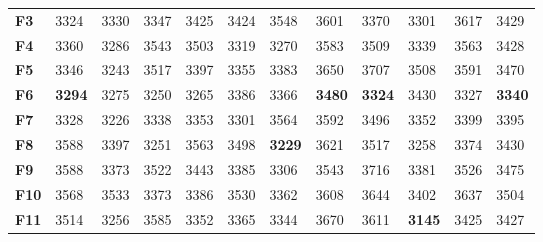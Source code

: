\documentclass[runningheads]{llncs}
\begin{document}
\begin{table}
\begin{center}
\begin{tabular}{|l|l|l|l|l|l|l|l|l|l|l|l|}
      \textbf{F3}          & 3324                           & 3330                           & 3347                           & 3425 & 3424                           & 3548                           & 3601                           & 3370 & 3301                           & 3617 & 3429 \\
      \textbf{F4}          & 3360                           & 3286                           & 3543                           & 3503 & 3319                           & 3270                           & 3583                           & 3509 & 3339                           & 3563 & 3428 \\
      \textbf{F5}          & 3346                           & 3243                           & 3517                           & 3397 & 3355                           & 3383                           & 3650                           & 3707 & 3508                           & 3591 & 3470 \\
      \textbf{F6}          & \textbf{3294} & 3275                           & 3250                           & 3265 & 3386                           & 3366                           & \textbf{3480} & \textbf{3324} & 3430                           & 3327 & \textbf{3340} \\
      \textbf{F7}          & 3328                           & 3226                           & 3338                           & 3353 & 3301                           & 3564                           & 3592                           & 3496 & 3352                           & 3399 & 3395 \\
      \textbf{F8}          & 3588                           & 3397                           & 3251                           & 3563 & 3498                           & \textbf{3229} & 3621                           & 3517 & 3258                           & 3374 & 3430 \\
      \textbf{F9}          & 3588                           & 3373                           & 3522                           & 3443 & 3385                           & 3306                           & 3543                           & 3716 & 3381                           & 3526 & 3475 \\
      \textbf{F10}         & 3568                           & 3533                           & 3373                           & 3386 & 3530                           & 3362                           & 3608                           & 3644 & 3402                           & 3637 & 3504 \\
      \textbf{F11}         & 3514                           & 3256                           & 3585                           & 3352 & 3365                           & 3344                           & 3670                           & 3611 & \textbf{3145} & 3425 & 3427 \\

\end{tabular}
\end{center}
\end{table}
\end{document}

